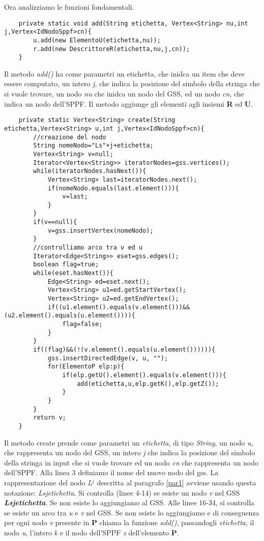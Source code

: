 Ora analizziamo le funzioni fondamentali.
\begin{lstlisting}
	private static void add(String etichetta, Vertex<String> nu,int j,Vertex<IdNodoSppf>cn){
		u.add(new ElementoU(etichetta,nu));
		r.add(new DescrittoreR(etichetta,nu,j,cn));
	}
\end{lstlisting}
Il metodo \textit{add()} ha come parametri un etichetta, che inidca un item che deve essere computato, un intero \textit{j}, che indica la posizione del simbolo della stringa che si vuole trovare, un nodo \textit{nu} che inidca un nodo del GSS, ed un nodo \textit{cn}, che indica un nodo dell'SPPF. Il metodo aggiunge gli elementi agli insiemi \textbf{R} ed \textbf{U}.
\begin{lstlisting}
	private static Vertex<String> create(String etichetta,Vertex<String> u,int j,Vertex<IdNodoSppf>cn){
		//creazione del nodo
		String nomeNodo="Ls"+j+etichetta;
		Vertex<String> v=null;
		Iterator<Vertex<String>> iteratorNodes=gss.vertices();
		while(iteratorNodes.hasNext()){
			Vertex<String> last=iteratorNodes.next();
			if(nomeNodo.equals(last.element())){
				v=last;
			}
		}
		if(v==null){
			v=gss.insertVertex(nomeNodo);
		}
		//controlliamo arco tra v ed u
		Iterator<Edge<String>> eset=gss.edges();
		boolean flag=true;
		while(eset.hasNext()){
			Edge<String> ed=eset.next();
			Vertex<String> u1=ed.getStartVertex();
			Vertex<String> u2=ed.getEndVertex();
			if((u1.element().equals(v.element()))&&(u2.element().equals(u.element()))){
				flag=false;
			}
		}
		if((flag)&&(!(v.element().equals(u.element()))))){
			gss.insertDirectedEdge(v, u, "");
			for(ElementoP elp:p){
				if(elp.getU().element().equals(v.element())){
					add(etichetta,u,elp.getK(),elp.getZ());
				}
			}
		}
		return v;
	}
\end{lstlisting}
Il metodo create prende come parametri un \textit{etichetta}, di tipo \textit{String}, un nodo \textit{u}, che rappresenta un nodo del GSS, un intero \textit{j} che indica la posizione del simbolo della stringa in input che si vuole trovare ed un nodo \textit{cn} che rappresenta un nodo dell'SPPF. Alla linea 3 definiamo il nome del nuovo nodo del gss. La rappresentazione del nodo \textit{L}$^{j}$ descritta al paragrafo \ref{par1} avviene usando questa notazione: \textit{Ls}\textit{j}\textit{etichetta}. Si controlla (linee 4-14) se esiste un nodo \textit{v} nel GSS \textbf{\textit{Ls}\textit{j}\textit{etichetta}}. Se non esiste lo aggiungiamo al GSS. Alle linee 16-34, si controlla se esiste un arco tra \textit{u} e \textit{v} nel GSS. Se non esiste lo aggiungiamo e di conseguenza per ogni nodo \textit{v} presente in \textbf{P} chiama la funzione \textit{add()}, passandogli \textit{etichetta}, il nodo \textit{u}, l'intero \textit{k} e il nodo dell'SPPF \textit{z} dell'elemento \textbf{P}.

